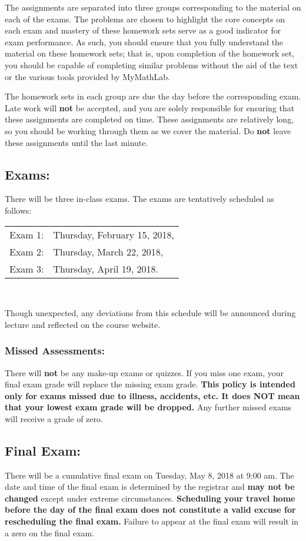 \documentclass[10pt]{amsart}
\begin{document}
The assignments are separated into three groups corresponding to the material on each of the exams.
The problems are chosen to highlight the core concepts on each exam and mastery of these homework sets serve as a good indicator for exam performance.
As such, you should ensure that you fully understand the material on these homework sets; that is, upon completion of the homework set, you should be capable of completing similar problems without the aid of the text or the various tools provided by MyMathLab.

The homework sets in each group are due the day before the corresponding exam.
Late work will {\bf not} be accepted, and you are solely responsible for ensuring that these assignments are completed on time.
These assignments are relatively long, so you should be working through them as we cover the material.
Do {\bf not} leave these assignments until the last minute.

\subsection*{Exams:}
There will be three in-class exams.
The exams are tentatively scheduled as follows:
\begin{center}
  \begin{tabular}{ll}
    Exam 1: & Thursday, February 15, 2018,\\
    Exam 2: & Thursday, March 22, 2018,\\
    Exam 3: & Thursday, April 19, 2018.\\
  \end{tabular}\\
\end{center}
Though unexpected, any deviations from this schedule will be announced during lecture and reflected on the course website.
\subsubsection*{Missed Assessments:}
There will {\bf not} be any make-up exams or quizzes.
If you miss one exam, your final exam grade will replace the missing exam grade.
\textbf{This policy is intended only for exams missed due to illness, accidents, etc.  
  It does NOT mean that your lowest exam grade will be dropped.}
Any further missed exams will receive a grade of zero.
\subsection*{Final Exam:} There will be a cumulative final exam on Tuesday, May 8, 2018 at 9:00 am.
The date and time of the final exam is determined by the registrar and \textbf{may not be changed} except under extreme circumstances.
\textbf{Scheduling your travel home before the day of the final exam does not constitute a valid excuse for rescheduling the final exam.}
Failure to appear at the final exam will result in a zero on the final exam.
\end{document}
